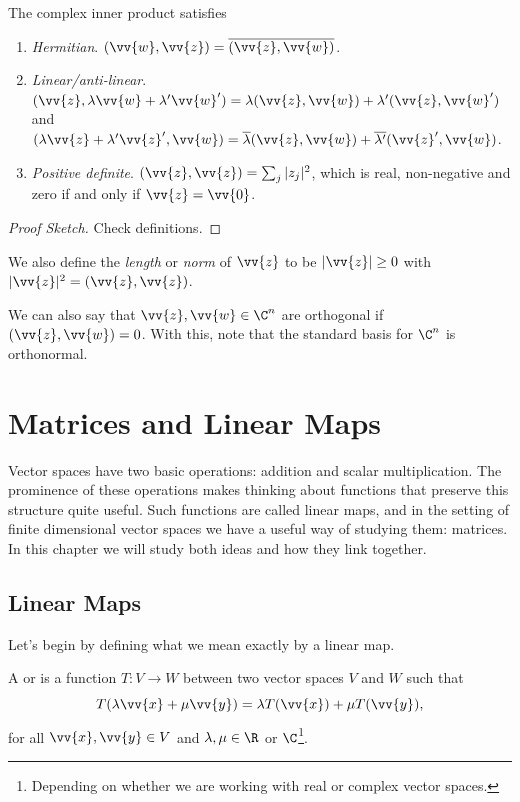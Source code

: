\begin{proposition}
    The complex inner product satisfies
    \begin{enumerate}[label=(\roman*)]
        \item \emph{Hermitian}. $(\vv{w}, \vv{z}) = \overline{(\vv{z}, \vv{w})}$.
        \item \emph{Linear/anti-linear}. $(\vv{z}, \lambda \vv{w}+ \lambda' \vv{w}') = \lambda(\vv{z}, \vv{w}) + \lambda' (\vv{z}, \vv{w}')$ and $(\lambda \vv{z} + \lambda' \vv{z}', \vv{w}) = \overline{\lambda}(\vv{z}, \vv{w}) + \overline{\lambda'} (\vv{z}' , \vv{w})$.
        \item \emph{Positive definite}. $(\vv{z}, \vv{z}) = \sum_j |z_j|^2$, which is real, non-negative and zero if and only if $\vv{z} = \vv{0}$.
    \end{enumerate}
\end{proposition}
\begin{proof}[Proof Sketch]
    Check definitions.
\end{proof}

We also define the \emph{length} or \emph{norm} of $\vv{z}$ to be $|\vv{z}| \geq 0$ with $|\vv{z}|^2 = (\vv{z}, \vv{z})$.

We can also say that $\vv{z}, \vv{w} \in \C^n$ are orthogonal if $(\vv{z}, \vv{w}) = 0$. With this, note that the standard basis for $\C^n$ is orthonormal.

\section{Matrices and Linear Maps}

Vector spaces have two basic operations: addition and scalar multiplication. 
The prominence of these operations makes thinking about functions that preserve this structure quite useful. Such functions are called linear maps, and in the setting of finite dimensional vector spaces we have a useful way of studying them: matrices. In this chapter we will study both ideas and how they link together.

\subsection{Linear Maps}

Let's begin by defining what we mean exactly by a linear map.

\begin{definition}
    A  or  is a function $T : V \rightarrow W$ between two vector spaces $V$ and $W$ such that
    $$
    T(\lambda \vv{x} + \mu \vv{y}) = \lambda T(\vv{x}) + \mu T(\vv{y}),
    $$
    for all $\vv{x}, \vv{y} \in V$ and $\lambda, \mu \in \R$ or $\C$\footnote{Depending on whether we are working with real or complex vector spaces.}.
\end{definition}

